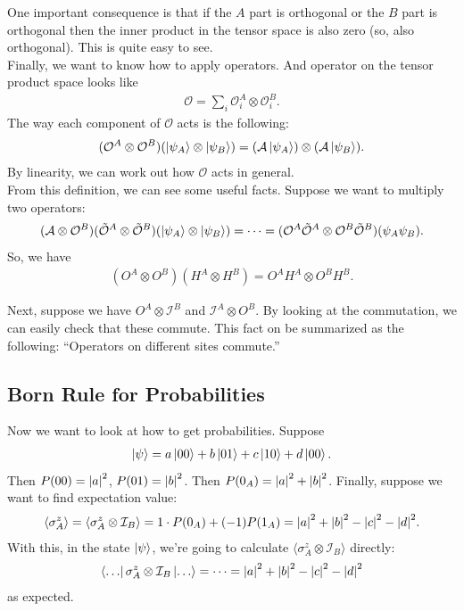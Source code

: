 \documentclass{book}
\theoremstyle{definition}
\newcommand{\Id}{\mathcal{I}}
\begin{document}
One important consequence is that if the $A$ part is orthogonal or the $B$ part is orthogonal then the inner product in the tensor space is also zero (so, also orthogonal). This is quite easy to see. \\

Finally, we want to know how to apply operators. And operator on the tensor product space looks like
\begin{align}
\mathcal{O} = \sum_i \mathcal{O}^A_i \otimes \mathcal{O}^B_i.
\end{align}
The way each component of $\mathcal{O}$ acts is the following:
\begin{align}
(\mathcal{O}^A \otimes \mathcal{O}^B) (\ket{\psi_A} \otimes \ket{\psi_B}) = (\mathcal{A} \ket{\psi_A}) \otimes (\mathcal{A} \ket{\psi_B}).
\end{align}
By linearity, we can work out how $\mathcal{O}$ acts in general.\\

From this definition, we can see some useful facts. Suppose we want to multiply two operators: 
\begin{align}
(\mathcal{A} \otimes \mathcal{O}^B)(\tilde{\mathcal{O}}^A \otimes \tilde{\mathcal{O}}^B )(\ket{\psi_A} \otimes \ket{\psi_B}) = \dots = (\mathcal{O}^A\tilde{\mathcal{O}}^A \otimes \mathcal{O}^B\tilde{\mathcal{O}}^B)(\psi_A\psi_B).
\end{align}
So, we have
\begin{align}
(O^A \otimes O^B)(H^A \otimes H^B)= O^A H^A \otimes O^B H^B. 
\end{align}

Next, suppose we have $O^A \otimes \Id^B$ and $\Id^A \otimes O^B$. By looking at the commutation, we can easily check that these commute. This fact on be summarized as the following: ``Operators on different sites commute.'' \\


\subsection{Born Rule for Probabilities}

Now we want to look at how to get probabilities. Suppose
\begin{align}
\ket{\psi} = a\ket{00} + b\ket{01} + c\ket{10} + d\ket{00}.
\end{align}
Then $P(00) = \abs{a}^2$, $P(01) = \abs{b}^2$. Then $P(0_A) = \abs{a}^2 + \abs{b}^2$. Finally, suppose we want to find expectation value:
\begin{align}
\langle \sigma^z_A \rangle = \langle \sigma^z_A \otimes \Id_B \rangle = 1\cdot P(0_A) + (-1)P(1_A) = \abs{a}^2 + \abs{b}^2 - \abs{c}^2 - \abs{d}^2.
\end{align}
With this, in the state $\ket{\psi}$, we're going to calculate $\langle \sigma^z_A \otimes \Id_B\rangle $ directly:
\begin{align}
\bra{\dots} \sigma^z_A \otimes \Id_B\ket{\dots} = \dots =  \abs{a}^2 + \abs{b}^2 - \abs{c}^2 - \abs{d}^2
\end{align}
as expected.
\end{document}
